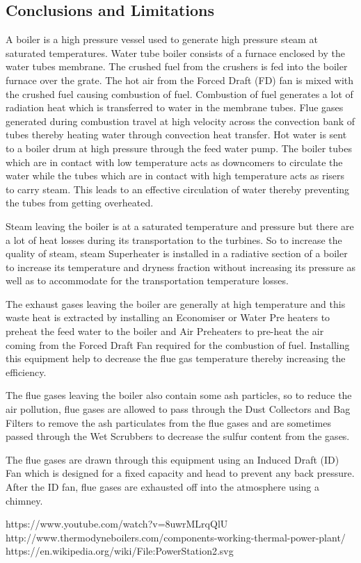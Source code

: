 \documentclass{report}
\begin{document}
\subsection{Conclusions and Limitations}
A boiler is a high pressure vessel used to generate high pressure steam at saturated temperatures. Water tube boiler consists of a furnace enclosed by the water tubes membrane. The crushed fuel from the crushers is fed into the boiler furnace over the grate. The hot air from the Forced Draft (FD) fan is mixed with the crushed fuel causing combustion of fuel.
Combustion of fuel generates a lot of radiation heat which is transferred to water in the membrane tubes. Flue gases generated during combustion travel at high velocity across the convection bank of tubes thereby heating water through convection heat transfer. Hot water is sent to a boiler drum at high pressure through the feed water pump. The boiler tubes which are in contact with low temperature acts as downcomers to circulate the water while the tubes which are in contact with high temperature acts as risers to carry steam. This leads to an effective circulation of water thereby preventing the tubes from getting overheated.

Steam leaving the boiler is at a saturated temperature and pressure but there are a lot of heat losses during its transportation to the turbines. So to increase the quality of steam, steam Superheater is installed in a radiative section of a boiler to increase its temperature and dryness fraction without increasing its pressure as well as to accommodate for the transportation temperature losses.

The exhaust gases leaving the boiler are generally at high temperature and this waste heat is extracted by installing an Economiser or Water Pre heaters to preheat the feed water to the boiler and Air Preheaters to pre-heat the air coming from the Forced Draft Fan required for the combustion of fuel. Installing this equipment help to decrease the flue gas temperature thereby increasing the efficiency.

The flue gases leaving the boiler also contain some ash particles, so to reduce the air pollution, flue gases are allowed to pass through the Dust Collectors and Bag Filters to remove the ash particulates from the flue gases and are sometimes passed through the Wet Scrubbers to decrease the sulfur content from the gases.

The flue gases are drawn through this equipment using an Induced Draft (ID) Fan which is designed for a fixed capacity and head to prevent any back pressure. After the ID fan, flue gases are exhausted off into the atmosphere using a chimney.
\\ 
\begin{thebibliography}{999}
https://www.youtube.com/watch?v=8uwrMLrqQlU
http://www.thermodyneboilers.com/components-working-thermal-power-plant/
https://en.wikipedia.org/wiki/File:PowerStation2.svg
\end{thebibliography}
\end{document}
